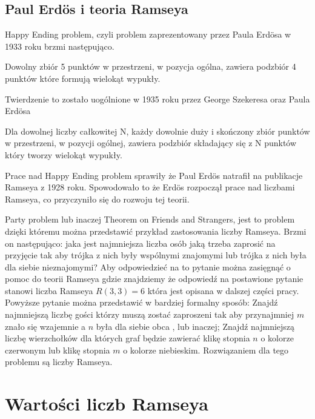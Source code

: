 \subsection{Paul Erd\"os i teoria Ramseya}

Happy Ending problem, czyli problem zaprezentowany przez Paula Erd\"osa w 1933 roku brzmi następująco. 

\begin{theorem}
Dowolny zbiór 5 punktów w przestrzeni, w pozycja ogólna, zawiera podzbiór 4 punktów które formują wielokąt wypukły.
\end{theorem}

Twierdzenie to zostało uogólnione w 1935 roku przez George Szekeresa oraz Paula Erd\"osa

\begin{theorem}
Dla dowolnej liczby całkowitej N, każdy dowolnie duży i skończony zbiór punktów w przestrzeni, w pozycji ogólnej, zawiera podzbiór składający się z N punktów który tworzy wielokąt wypukły. \cite{erdoshappy} 
\end{theorem}

Prace nad Happy Ending problem sprawiły że Paul Erd\"os natrafił na publikacje Ramseya z 1928 roku. Spowodowało to że Erd\"os rozpoczął prace nad liczbami Ramseya, co przyczyniło się do rozwoju tej teorii.


\hfill  \par
Party problem lub inaczej Theorem on Friends and Strangers, jest to problem dzięki któremu można przedstawić przykład zastosowania liczby Ramseya. Brzmi on następująco: jaka jest najmniejsza liczba osób jaką trzeba zaprosić na przyjęcie tak aby trójka z nich były wspólnymi znajomymi lub trójka z nich była dla siebie nieznajomymi\cite{partyproblem}? Aby odpowiedzieć na to pytanie można zasięgnąć o pomoc do teorii Ramseya gdzie znajdziemy że odpowiedź na postawione pytanie stanowi liczba Ramseya $R(3,3)=6$ która jest opisana w dalszej części pracy. Powyższe pytanie można przedstawić w bardziej formalny sposób: Znajdź najmniejszą liczbę gości którzy muszą zostać zaproszeni tak aby przynajmniej $m$ znało się wzajemnie a $n$ była dla siebie obca \cite{partyformal}, lub inaczej; Znajdź najmniejszą liczbę wierzchołków dla których graf będzie zawierać klikę stopnia $n$ o kolorze czerwonym lub klikę stopnia $m$ o kolorze niebieskim. Rozwiązaniem dla tego problemu są liczby Ramseya. 


\section{Wartości liczb Ramseya}

